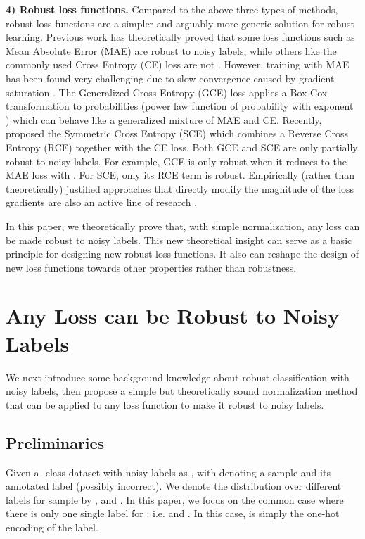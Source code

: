 \documentclass{article}
\begin{document}
\noindent\textbf{4) Robust loss functions.} 
Compared to the above three types of methods, robust loss functions are a simpler and arguably more generic solution for robust learning.
Previous work has theoretically proved that some loss functions such as Mean Absolute Error (MAE) are robust to noisy labels, while others like the commonly used Cross Entropy (CE) loss are not \cite{ghosh2017robust}.
However, training with MAE has been found very challenging due to slow convergence caused by gradient saturation \cite{zhang2018generalized}.
The Generalized Cross Entropy (GCE) loss \cite{zhang2018generalized} applies a Box-Cox transformation to probabilities (power law function of probability with exponent ) which can behave like a generalized mixture of MAE and CE. Recently, \citet{wang2019symmetric} proposed the Symmetric Cross Entropy (SCE) which combines a Reverse Cross Entropy (RCE) together with the CE loss.  Both GCE and SCE are only partially robust to noisy labels. For example, GCE is only robust when it reduces to the MAE loss with . For SCE, only its RCE term is robust. Empirically (rather than theoretically) justified approaches that directly modify the magnitude of the loss gradients are also an active line of research \cite{wang2019imae, wang2019derivative}. 

In this paper, we theoretically prove that, with simple normalization, any loss can be made robust to noisy labels. This new theoretical insight can serve as a basic principle for designing new robust loss functions. It also can reshape the design of new loss functions towards other properties rather than robustness.

\section{Any Loss can be Robust to Noisy Labels}\label{sec:any_loss_robust}
We next introduce some background knowledge about robust classification with noisy labels, then propose a simple but theoretically sound normalization method that can be applied to any loss function to make it robust to noisy labels.

\subsection{Preliminaries}\label{sec:preliminary}
Given a -class dataset with noisy labels as , with  denoting a sample and  its annotated label (possibly incorrect).
We denote the distribution over different labels for sample  by , and . In this paper, we focus on the common case where there is only one single label  for : i.e.  and . In this case,  is simply the one-hot encoding of the label.
\end{document}
